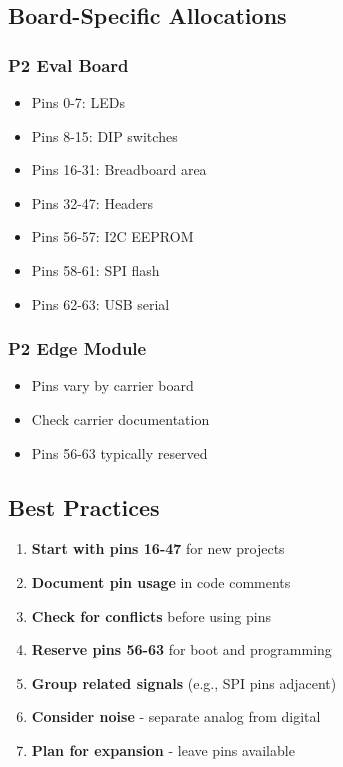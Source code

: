 \documentclass[11pt]{book}
\providecommand{\tightlist}{%
  \setlength{\itemsep}{0pt}\setlength{\parskip}{0pt}}
\begin{document}
\hypertarget{board-specific-allocations}{%
\subsection{Board-Specific
Allocations}\label{board-specific-allocations}}

\hypertarget{p2-eval-board}{%
\subsubsection{P2 Eval Board}\label{p2-eval-board}}

\begin{itemize}
\tightlist
\item
  Pins 0-7: LEDs
\item
  Pins 8-15: DIP switches
\item
  Pins 16-31: Breadboard area
\item
  Pins 32-47: Headers
\item
  Pins 56-57: I2C EEPROM
\item
  Pins 58-61: SPI flash
\item
  Pins 62-63: USB serial
\end{itemize}

\hypertarget{p2-edge-module}{%
\subsubsection{P2 Edge Module}\label{p2-edge-module}}

\begin{itemize}
\tightlist
\item
  Pins vary by carrier board
\item
  Check carrier documentation
\item
  Pins 56-63 typically reserved
\end{itemize}

\hypertarget{best-practices}{%
\subsection{Best Practices}\label{best-practices}}

\begin{enumerate}
\def\labelenumi{\arabic{enumi}.}
\tightlist
\item
  \textbf{Start with pins 16-47} for new projects
\item
  \textbf{Document pin usage} in code comments
\item
  \textbf{Check for conflicts} before using pins
\item
  \textbf{Reserve pins 56-63} for boot and programming
\item
  \textbf{Group related signals} (e.g., SPI pins adjacent)
\item
  \textbf{Consider noise} - separate analog from digital
\item
  \textbf{Plan for expansion} - leave pins available
\end{enumerate}
\end{document}
